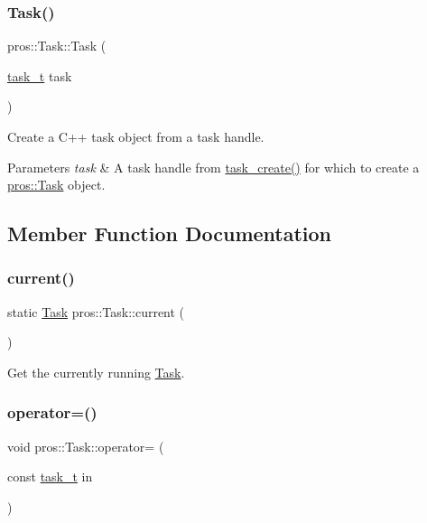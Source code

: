 \subsubsection{\texorpdfstring{Task()}{Task()}\hspace{0.1cm}{\footnotesize\ttfamily [5/5]}}
{\footnotesize\ttfamily pros\+::\+Task\+::\+Task (\begin{DoxyParamCaption}\item[{\hyperlink{rtos_8h_a1d7e0825b8d8876e8cd8ece3f9115293}{task\+\_\+t}}]{task }\end{DoxyParamCaption})}



Create a C++ task object from a task handle. 


\begin{DoxyParams}{Parameters}
{\em task} & A task handle from \hyperlink{rtos_8h_a2e3ed8f26b8c1edcff493bc583f0a76a}{task\+\_\+create()} for which to create a \hyperlink{classpros_1_1Task}{pros\+::\+Task} object. \\
\hline
\end{DoxyParams}


\subsection{Member Function Documentation}
\mbox{\label{classpros_1_1Task_a510ca3e67e54aa4293438d73148a1d6b}} 
\subsubsection{\texorpdfstring{current()}{current()}}
{\footnotesize\ttfamily static \hyperlink{classpros_1_1Task}{Task} pros\+::\+Task\+::current (\begin{DoxyParamCaption}{ }\end{DoxyParamCaption})\hspace{0.3cm}{\ttfamily [static]}}



Get the currently running \hyperlink{classpros_1_1Task}{Task}. 

\mbox{\label{classpros_1_1Task_aaaeae2788114241e149317248998781e}} 
\subsubsection{\texorpdfstring{operator=()}{operator=()}}
{\footnotesize\ttfamily void pros\+::\+Task\+::operator= (\begin{DoxyParamCaption}\item[{const \hyperlink{rtos_8h_a1d7e0825b8d8876e8cd8ece3f9115293}{task\+\_\+t}}]{in }\end{DoxyParamCaption})}



